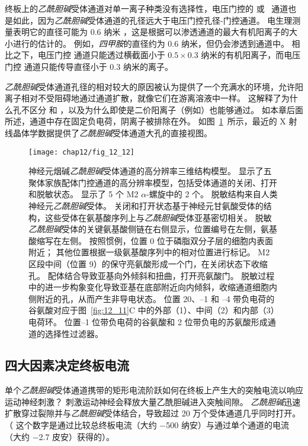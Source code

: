 终板上的\textit{乙酰胆碱}受体通道对单一离子种类没有选择性，电压门控的  或~ 通道也是如此，因为\textit{乙酰胆碱}受体通道的孔径远大于电压门控孔径-门控通道。
电生理测量表明它的直径可能为 0.6 纳米 ，这是根据可以渗透通道的最大有机阳离子的大小进行的估计的。
例如，\textit{四甲胺}的直径约为 0.6 纳米，但仍会渗透到通道中。
相比之下，电压门控  通道只能透过横截面小于 $ 0.5 \times 0.3 $ 纳米的有机阳离子，而电压门控  通道只能传导直径小于 0.3 纳米的离子。


\textit{乙酰胆碱}受体通道孔径的相对较大的原因被认为提供了一个充满水的环境，允许阳离子相对不受阻碍地通过通道扩散，就像它们在游离溶液中一样。
这解释了为什么孔不区分  和 ，以及为什么即使是二价阳离子（例如）也能够通过。
如本章后面所述，通道中存在固定负电荷，阴离子被排除在外。
如图~\ref{fig:12_12}~所示，最近的 X 射线晶体学数据提供了\textit{乙酰胆碱}受体通道大孔的直接视图。


\begin{figure}[htbp]
	\centering
	\texttt{[image: chap12/fig\_12\_12]}
	\caption{神经元烟碱\textit{乙酰胆碱}受体通道的高分辨率三维结构模型。
		显示了五聚体家族配体门控通道的高分辨率模型，包括受体通道的关闭、打开和脱敏状态。
		显示了 5 个 M2 $\alpha$-螺旋中的 2 个。
		脱敏结构来自人类神经元\textit{乙酰胆碱}受体。
		关闭和打开状态基于神经元甘氨酸受体的结构，这些受体在氨基酸序列上与\textit{乙酰胆碱}受体亚基密切相关。
		脱敏\textit{乙酰胆碱}受体的关键氨基酸侧链在右侧显示，位置编号在左侧，氨基酸缩写在左侧。
		按照惯例，位置 0 位于磷脂双分子层的细胞内表面附近；
		其他位置根据一级氨基酸序列中的相对位置进行标记。
		M2 区段中间（位置 9）的保守亮氨酸形成一个门，在关闭状态下收缩孔。
		配体结合导致亚基向外倾斜和扭曲，打开亮氨酸门。
		脱敏过程中的进一步构象变化导致亚基在底部附近向内倾斜，收缩通道细胞内侧附近的孔，从而产生非导电状态。
		位置 20、–1 和 –4 带负电荷的谷氨酸对应于图~\ref{fig:12_11}C 中的外部（1）、中间（2）和内部（3） 电荷环。
		位置–1 位带负电荷的谷氨酸和 2 位带负电的苏氨酸形成通道的选择性过滤器\cite{morales2016x}。}
	\label{fig:12_12}
\end{figure}



\subsection{四大因素决定终板电流}

单个\textit{乙酰胆碱}受体通道携带的矩形电流阶跃如何在终板上产生大的突触电流以响应运动神经刺激？
刺激运动神经会释放大量乙酰胆碱进入突触间隙。
\textit{乙酰胆碱}迅速扩散穿过裂隙并与\textit{乙酰胆碱}受体结合，导致超过 20 万个受体通道几乎同时打开。
（ 这个数字是通过比较总终板电流（大约 −500 纳安）与通过单个通道的电流（大约 −2.7 皮安）获得的）。


